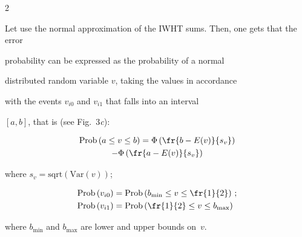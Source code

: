 \begin{multicols}{2}
\begin{figure}
\begin{minipage}[t]{80mm}
 \vspace*{-9pt}


\end{minipage}

\vspace*{6pt}

\end{figure}



Let use the normal approximation of the IWHT sums. Then, one gets that the error

probability can be expressed as the probability of a normal

distributed random variable $v$, taking the values in accordance

with the events $v_{i0}$ and $v_{i1}$ that falls into an interval

$[a,b]$, that is (see Fig.~3\textit{c}):

\begin{multline}

\mathrm{Prob}\left(a \le v \le b\right)=\Phi\left(\fr{b-E(v)}{s_v}\right)\\

-\Phi\left(\fr{a-E(v)}{s_v}\right) 

\label{e1-fr}

\end{multline}

where $s_v=\mathrm{sqrt}\left(\mathrm{Var}\left(v\right)\right)$;

\begin{align}

\mathrm{Prob}\left(v_{i0}\right) &= \mathrm{Prob}\left(b_{\min} \le v\le \fr{1}{2}\right)\,;

 \label{e2-fr}

\\

\mathrm{Prob}\left(v_{i1}\right) &= \mathrm{Prob}\left(\fr{1}{2} \le v\le b_{\max}\right) \label{e3-fr}

\end{align}

where $b_{\min}$ and $b_{\max}$ are lower and upper bounds on~$v$.






\end{multicols}
